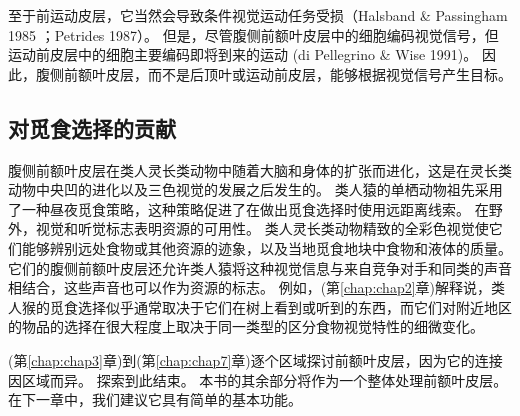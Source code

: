 至于前运动皮层，它当然会导致条件视觉运动任务受损（Halsband  \& Passingham 1985 ；Petrides 1987）。 
但是，尽管腹侧前额叶皮层中的细胞编码视觉信号，但运动前皮层中的细胞主要编码即将到来的运动 (di Pellegrino \& Wise 1991)。 
因此，腹侧前额叶皮层，而不是后顶叶或运动前皮层，能够根据视觉信号产生目标。



\subsection{对觅食选择的贡献}
\par

腹侧前额叶皮层在类人灵长类动物中随着大脑和身体的扩张而进化，这是在灵长类动物中央凹的进化以及三色视觉的发展之后发生的。 
类人猿的单栖动物祖先采用了一种昼夜觅食策略，这种策略促进了在做出觅食选择时使用远距离线索。 
在野外，视觉和听觉标志表明资源的可用性。 
类人灵长类动物精致的全彩色视觉使它们能够辨别远处食物或其他资源的迹象，以及当地觅食地块中食物和液体的质量。 
它们的腹侧前额叶皮层还允许类人猿将这种视觉信息与来自竞争对手和同类的声音相结合，这些声音也可以作为资源的标志。 
例如，(第\ref{chap:chap2}章)解释说，类人猴的觅食选择似乎通常取决于它们在树上看到或听到的东西，而它们对附近地区的物品的选择在很大程度上取决于同一类型的区分食物视觉特性的细微变化。 
\par


(第\ref{chap:chap3}章)到(第\ref{chap:chap7}章)逐个区域探讨前额叶皮层，因为它的连接因区域而异。
探索到此结束。
本书的其余部分将作为一个整体处理前额叶皮层。 
在下一章中，我们建议它具有简单的基本功能。

